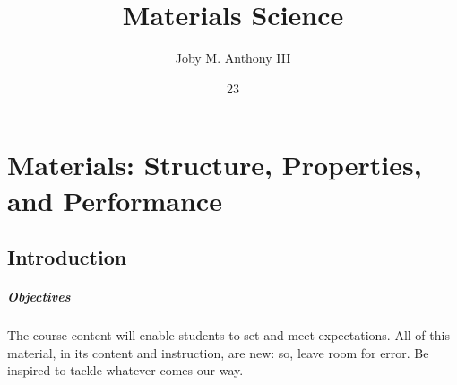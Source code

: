 \documentclass[english,course]{Notes}
\title{Materials Science}
\author{Joby M. Anthony III}
\date{23}{08}{2021}
\begin{document}

\tableofcontents










\chapter{Materials: Structure, Properties, and Performance}
	\section{Introduction}
		\paragraph{Objectives} The course content will enable students to set and meet expectations.
		All of this material, in its content and instruction, are new: so, leave room for error.
		Be inspired to tackle whatever comes our way.











% 
\end{document}
